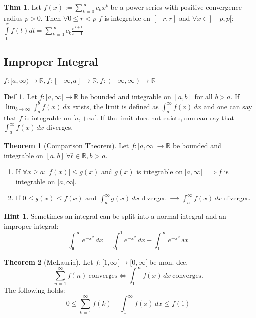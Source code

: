 \documentclass[a4paper, 10pt]{article}
\theoremstyle{definition}
\newtheorem*{theorem}{Thm}
\newtheorem*{definition}{Def}
\newtheorem*{note_wrapper}{Hint}
\theoremstyle{named}
\newtheorem*{ntheorem_wrapper}{Theorem}
\newenvironment{ntheorem}%
    {\begin{mdframed}[style=important]\begin{ntheorem_wrapper}}%
    {\end{ntheorem_wrapper}\end{mdframed}}
\newenvironment{note}%
    {\begin{mdframed}[style=trick]\begin{note_wrapper}}%
    {\end{note_wrapper}\end{mdframed}}
\newcommand{\R}{\mathbb{R}}
\begin{document}
\begin{theorem}
    Let $f(x) := \sum_{k=0}^\infty c_k x^k$ be a power series with positive convergence radius $p > 0$. Then $\forall 0 \leq r < p$ $f$ is integrable on $[-r, r]$ and $\forall x \in ]-p, p[$:
    $\int\limits_0^x f(t) dt = \sum\limits_{k=0}^\infty c_k \frac{x^{k + 1}}{k + 1}$
\end{theorem}

\subsection{Improper Integral}
\begin{center}
    $f: [a, \infty) \to \R, f: [-\infty, a] \to \R, f: (-\infty, \infty) \to \R$
\end{center}

\begin{definition}
    Let $f: [a, \infty[ \to \R$ be bounded and integrable on $[a, b]$ for all $b > a$. If $\lim_{b \to \infty} \int_a^b f(x) \,dx$ exists, the limit is defined as $\int_a^\infty f(x) \,dx$ and one can say that $f$ is integrable on $[a, +\infty[$. If the limit does not exists, one can say that $\int_a^\infty f(x) \,dx$ diverges.
\end{definition}

\begin{ntheorem}[Comparison Theorem]
    Let $f: [a, \infty[ \to \R$ be bounded and integrable on $[a, b] \ \forall b \in \R, b > a$.
    \begin{enumerate}
        \item If $\forall x \geq a : |f(x)| \leq g(x)$ and $g(x)$ is integrable on $[a, \infty[$ $\implies f$ is integrable on $[a, \infty[$.
        \item If $0 \leq g(x) \leq f(x)$ and $\int_a^\infty g(x) \,dx$ diverges $\implies \int_a^\infty f(x) \,dx$ diverges.
    \end{enumerate}
\end{ntheorem}

\begin{note}
    Sometimes an integral can be split into a normal integral and an improper integral:
    $$\int_0^\infty e^{-x^2} \,dx = \int_0^1 e^{-x^2} \,dx + \int_1^\infty e^{-x^2} \,dx$$
\end{note}

\begin{ntheorem}[McLaurin]
    Let $f: [1, \infty[ \to [0, \infty[$ be mon. dec.
    $$\sum_{n=1}^\infty f(n) \ \text{converges} \iff \int_1^\infty f(x) \,dx \ \text{converges}.$$ 
    The following holds:
    $$0 \leq \sum_{k=1}^\infty f(k) - \int_1^\infty f(x) \,dx \leq f(1)$$
\end{ntheorem}
\end{document}

